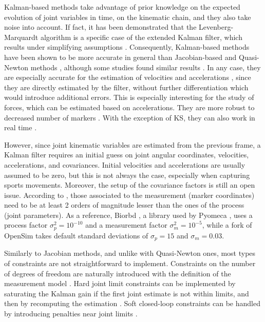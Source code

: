 Kalman-based methods take advantage of prior knowledge on the expected evolution of joint variables in time, on the kinematic chain, and they also take noise into account. If fact, it has been demonstrated that the Levenberg-Marquardt algorithm is a specific case of the extended Kalman filter, which results under simplifying assumptions \cite{Bell1994,Horvath2016}. Consequently, Kalman-based methods have been shown to be more accurate in general than Jacobian-based and Quasi-Newton methods \cite{Cerveri2005,DeGroote2008, Bonnet2017a}, although some studies found similar results \cite{Fohanno2014}. In any case, they are especially accurate for the estimation of velocities and accelerations \cite{Fohanno2014}, since they are directly estimated by the filter, without further differentiation which would introduce additional errors. This is especially interesting for the study of forces, which can be estimated based on accelerations. They are more robust to decreased number of markers \cite{Fohanno2010}. With the exception of KS, they can also work in real time \cite{Fohanno2014}. 

However, since joint kinematic variables are estimated from the previous frame, a Kalman filter requires an initial guess on joint angular coordinates, velocities, accelerations, and covariances. Initial velocities and accelerations are usually assumed to be zero, but this is not always the case, especially when capturing sports movements. Moreover, the setup of the covariance factors is still an open issue. According to \cite{Cerveri2005}, those associated to the measurement (marker coordinates) need to be at least 2 orders of magnitude lesser than the ones of the process (joint parameters). As a reference, Biorbd \cite{Michaud2021}, a library used by Pyomeca \cite{Martinez2020}, uses a process factor $\sigma^2_p=10^{-10}$ and a measurement factor $\sigma^2_m=10^{-5}$, while a fork of OpenSim \cite{DeGroote2008} takes default standard deviations of $\sigma_p=15$ and $\sigma_m=0.03$.

Similarly to Jacobian methods, and unlike with Quasi-Newton ones, most types of constraints are not straightforward to implement. Constraints on the number of degrees of freedom are naturally introduced with the definition of the measurement model \cite{Halvorsen2008}. Hard joint limit constraints can be implemented by saturating the Kalman gain if the first joint estimate is not within limits, and then by recomputing the estimation \cite{Bonnet2017b}. Soft closed-loop constraints can be handled by introducing penalties near joint limits \cite{Fohanno2014}.

